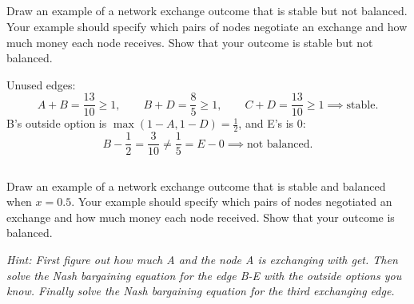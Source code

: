 \documentclass[newpages]{assignment}
\begin{document}
\subsection{}
\begin{problem}
    Draw an example of a network exchange outcome that is stable but not balanced. Your example should specify which pairs of nodes negotiate an exchange and how much money each node receives. Show that your outcome is stable but not balanced.
\end{problem}

\begin{figure}[H]
    \centering
\end{figure}

\begin{solution}
    Unused edges:
    \[
        A+B=\frac{13}{10}\geq 1,\qquad B+D=\frac{8}{5}\geq 1,\qquad C+D=\frac{13}{10}\geq 1
        \implies \text{stable}.
    \]
    B's outside option is \(\max(1-A,1-D)=\frac12\), and E's is 0:
    \[
        B-\frac12=\frac{3}{10}\neq\frac15=E-0
        \implies \text{not balanced}.
    \]
\end{solution}

\subsection{}
\begin{problem}
    Draw an example of a network exchange outcome that is stable and balanced when \(x=0.5\). Your example should specify which pairs of nodes negotiated an exchange and how much money each node received. Show that your outcome is balanced.

    \textit{Hint: First figure out how much A and the node A is exchanging with get. Then solve the Nash bargaining equation for the edge B-E with the outside options you know. Finally solve the Nash bargaining equation for the third exchanging edge.}
\end{problem}
\end{document}
